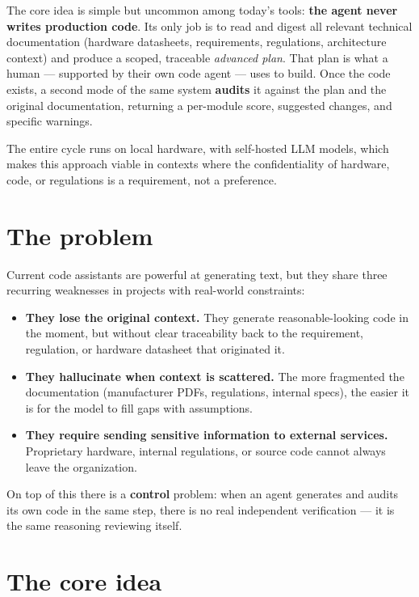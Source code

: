 \documentclass[11pt]{article}
\begin{document}
The core idea is simple but uncommon among today's tools: \textbf{the agent never writes production code}. Its only job is to read and digest all relevant technical documentation (hardware datasheets, requirements, regulations, architecture context) and produce a scoped, traceable \emph{advanced plan}. That plan is what a human --- supported by their own code agent --- uses to build. Once the code exists, a second mode of the same system \textbf{audits} it against the plan and the original documentation, returning a per-module score, suggested changes, and specific warnings.

The entire cycle runs on local hardware, with self-hosted LLM models, which makes this approach viable in contexts where the confidentiality of hardware, code, or regulations is a requirement, not a preference.

\section{The problem}

Current code assistants are powerful at generating text, but they share three recurring weaknesses in projects with real-world constraints:

\begin{itemize}
  \item \textbf{They lose the original context.} They generate reasonable-looking code in the moment, but without clear traceability back to the requirement, regulation, or hardware datasheet that originated it.
  \item \textbf{They hallucinate when context is scattered.} The more fragmented the documentation (manufacturer PDFs, regulations, internal specs), the easier it is for the model to fill gaps with assumptions.
  \item \textbf{They require sending sensitive information to external services.} Proprietary hardware, internal regulations, or source code cannot always leave the organization.
\end{itemize}

On top of this there is a \textbf{control} problem: when an agent generates and audits its own code in the same step, there is no real independent verification --- it is the same reasoning reviewing itself.

\section{The core idea}
\end{document}
